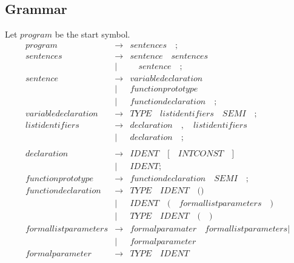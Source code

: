 \documentclass{article}
\begin{document}
\subsection*{Grammar}

Let $program$ be the start symbol. 
\begin{eqnarray}
  \mathit{program} & \rightarrow & \mathit{sentences} \quad ;
  \\
    \mathit{sentences} & \rightarrow & \mathit{sentence} \quad \mathit{sentences} \quad  \\
    & | & \quad \mathit{sentence} \quad ;
    \\
      \mathit{sentence} & \rightarrow & \mathit{variabledeclaration} \quad \\
      & |& \mathit{functionprototype} \quad \\
      & |& \mathit{functiondeclaration} \quad ;
\\
  \mathit{variabledeclaration} & \rightarrow & \mathit{TYPE} \quad \mathit{listidentifiers} \quad \mathit{SEMI} \quad ; 
  \\
  \mathit{listidentifiers} & \rightarrow & \mathit{declaration} \quad \mathit{,} \quad \mathit{listidentifiers} \quad   \\
  &  |& \mathit{declaration} \quad ; \\
\\
  \mathit{declaration} & \rightarrow & \mathit{IDENT} \quad \mathit{[} \quad  \mathit{INTCONST} \quad \mathit{]} \quad  \\
  & | & \mathit{IDENT} ;  \\
  \mathit{functionprototype} & \rightarrow &  \mathit{functiondeclaration}  \quad \mathit{SEMI} \quad ;\\
  \mathit{functiondeclaration} & \rightarrow & \mathit{TYPE} \quad \mathit{IDENT} \quad  \mathit{(} \mathit{)} \\
  & | & \mathit{IDENT} \quad \mathit{(} \quad \mathit{formallistparameters} \quad \mathit{)}  \\ 
  & | & \mathit{TYPE} \quad \mathit{IDENT} \quad \mathit{(} \quad \mathit{)}\\
   \mathit{formallistparameters} & \rightarrow & \mathit{formalparamater} \quad \mathit{formallistparameters}  | \\
   & | & \mathit{formalparameter} \\
   \mathit{formalparameter} & \rightarrow & \mathit{TYPE} \quad \mathit{IDENT}  \\

\end{eqnarray}
\end{document}
